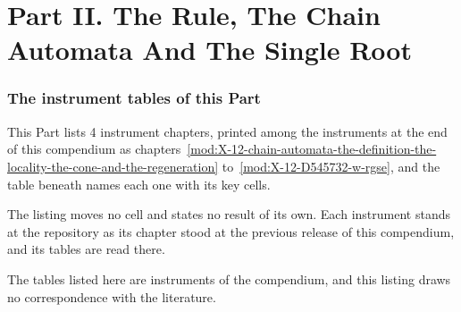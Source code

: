 \clearpage
\part*{Part II. The Rule, The Chain Automata And The Single Root}
\label{atlaspart:02-rule}
\section{The instrument tables of this Part}\label{mod:II-L-the-instrument-tables-at-the-repository}
\begin{chtable}\label{box:II-L-the-instrument-tables-at-the-repository:1}
This Part lists 4 instrument chapters, printed among the instruments at the end of this compendium as chapters~\ref{mod:X-12-chain-automata-the-definition-the-locality-the-cone-and-the-regeneration} to~\ref{mod:X-12-D545732-w-rgse}, and the table beneath names each one with its key cells.
\end{chtable}
The listing moves no cell and states no result of its own. Each instrument stands at the repository as its chapter stood at the previous release of this compendium, and its tables are read there.
\begin{chbridge}
The tables listed here are instruments of the compendium, and this listing draws no correspondence with the literature.
\end{chbridge}
